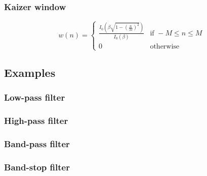 \subsubsection{Kaizer window}
$$w(n)=\begin{cases}
  \frac{I_0\left(\beta\sqrt{1-\left(\frac{n}{M}\right)^{2}}\right)}{I_0(\beta)}& \text{if } -M\leq n\leq M\\
0 & \text{otherwise}
\end{cases}$$

\subsection{Examples}
\subsubsection{Low-pass filter}
\subsubsection{High-pass filter}
\subsubsection{Band-pass filter}
\subsubsection{Band-stop filter}
